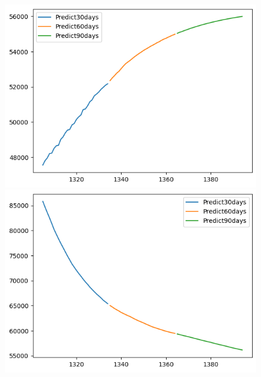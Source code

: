 \begin{figure}[H]
    \hfill
        \begin{minipage}{0.15\textwidth}
    \centering
    \includegraphics[width=1\textwidth]{resources/chapter-5/newdata1/predicted/BIDV_ RNN_9-1_30days.png}
    \end{minipage}
    \hfill
    \begin{minipage}{0.15\textwidth}
    \centering
    \includegraphics[width=1\textwidth]{resources/chapter-5/newdata1/predicted/VCB_ RNN_7-3_30days.png}
    \end{minipage}
    \hfill
    \begin{minipage}{0.15\textwidth}
    \centering

\end{minipage}
\end{figure}
